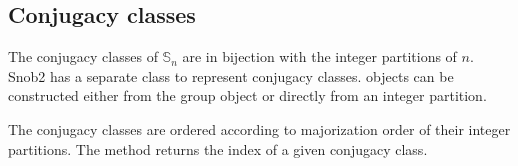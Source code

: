 \documentclass[letterpaper,10pt,english]{sphinxmanual}
\begin{document}
\begin{sphinxVerbatim}[commandchars=\\\{\}]
\PYG{p}{[}\PYG{p}{]}
\end{sphinxVerbatim}


\subsection{Conjugacy classes}
\label{\detokenize{index:conjugacy-classes}}
\sphinxAtStartPar
The conjugacy classes of \(\mathbb{S}_n\) are in bijection with the integer partitions of \(n\).
Snob2 has a separate class  to represent conjugacy classes.  objects can
be constructed either from the group object or directly from an integer partition.

\begin{sphinxVerbatim}[commandchars=\\\{\}]
\PYG{p}{[}\PYG{p}{]}
\end{sphinxVerbatim}

\sphinxAtStartPar
The conjugacy classes are ordered according to majorization order of their integer partitions.
The  method returns the index of a given conjugacy class.

\begin{sphinxVerbatim}[commandchars=\\\{\}]
\end{sphinxVerbatim}
\end{document}
